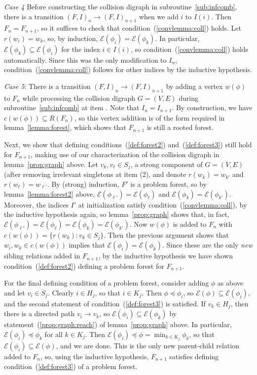 \documentclass[11pt,reqno]{amsart}
\theoremstyle{definition}
\numberwithin{equation}{section}
\newcommand{\pre}{\phi}
\newcommand{\sub}{\subseteq}
\newcommand{\fix}{\mathcal{E}}
\newcommand{\peq}{\preceq}
\newcommand{\strongcomp}{S}
\newcommand{\coll}{I}
\newcommand{\reach}{H}
\newcommand{\forest}{F}
\newcommand{\pair}{(F,I)}
\newcommand{\roott}{R}
\newcommand{\infcombgraphii}{(2)\xspace}
\begin{document}
\emph{Case 4} Before constructing the collision digraph in subroutine~\ref{sub:infcomb}, there is a transition $\pair_n \to \pair_{n + 1}$ when we add $i$ to $\coll(i)$. 
Then $\forest_n = \forest_{n + 1}$, so it suffices to check that condition~(\ref{convlemma:coll}) holds. 
Let $r(w_i) = w_k$, so, by induction, $\fix(\pre_i) = \fix(\pre_k)$. 
In particular, $\fix(\pre_k) \sub \fix(\pre_i)$ for the index $i \in \coll(i)$, so condition~(\ref{convlemma:coll}) holds automatically.
Since this was the only modification to $\coll_n$, condition~(\ref{convlemma:coll}) follows for other indices by the inductive hypothesis.

\emph{Case 5}: There is a transition $\pair_n \to \pair_{n + 1}$ by adding a vertex $w(\pre)$ to $\forest_n$ while processing the collision digraph $G = (V,E)$ during subroutine~\ref{sub:infcomb} at item \infcombcombb. 
Note that $\coll_n = \coll_{n + 1}$. 
By construction, we have $c(w(\pre)) \sub \roott(\forest_n)$, so this vertex addition is of the form required in lemma~\ref{lemma:forest}, which shows that $\forest_{n + 1}$ is still a rooted forest.  

Next, we show that defining conditions~(\ref{def:forest2}) and~(\ref{def:forest3}) still hold for $\forest_{n + 1}$, making use of our characterization of the collision digraph in lemma~\ref{prop:graph} above.
Let $v_k, v_{\ell} \in \strongcomp_j$, a strong component of $G = (V,E)$ (after removing irrelevant singletons at item \infcombgraphii, and denote $r(w_k) = w_{k'}$ and $r(w_{\ell}) = w_{\ell'}$.
By (strong) induction, $\forest'$ is a problem forest, so by lemma~\ref{lemma:forest2} above, $\fix(\pre_{\ell'}) = \fix(\pre_{\ell})$ and $\fix(\pre_k) = \fix(\pre_{k'})$. 
Moreover, the indices $\coll'$ at initialization satisfy condition~(\ref{convlemma:coll}), by the inductive hypothesis again, so lemma~\ref{prop:graph} shows that, in fact, $\fix(\pre_{\ell'}) = \fix(\pre_{\ell}) = \fix(\pre_k) = \fix(\pre_{k'})$. 
Now $w(\pre)$ is added to $\forest_n$ with $c(w(\pre)) = \{r(w_k):v_k \in \strongcomp_j\}$. 
Then the previous argument shows that $w_i,w_k \in c(w(\pre))$ implies that $\fix(\pre_i) = \fix(\pre_k)$. 
Since these are the only \emph{new} sibling relations added in $\forest_{n+1}$, by the inductive hypothesis we have shown condition~(\ref{def:forest2}) defining a problem forest for $\forest_{n+1}$. 

For the final defining condition of a problem forest, consider adding $\pre$ as above and let $v_i \in \strongcomp_j$. 
Clearly $i \in \reach_j$, so that $i \in K_j$. 
Then $\pre \peq \pre_i$, so $\fix(\pre) \sub \fix(\pre_i)$, and the second statement of condition~(\ref{def:forest3}) is satisfied. 
If $v_k \in \reach_j$, then there is a directed path $v_i \to v_k$, so $\fix(\pre_i) \sub \fix(\pre_k)$ by statement~(\ref{prop:graph:reach}) of lemma~\ref{prop:graph} above.
In particular, $\fix(\pre_i) \peq \pre_k$ for all $k \in K_j$. 
Then $\fix(\pre_i) \peq \pre = \min_{k \in K_j} \pre_k$, so that $\fix(\pre_i) \sub \fix(\pre)$, and we are done. 
This is the only new parent-child relation added to $\forest_n$, so, using the inductive hypothesis, $\forest_{n+1}$ satisfies defining condition~(\ref{def:forest3}) of a problem forest. 
\end{document}
